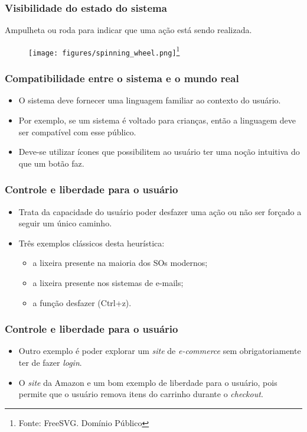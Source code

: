 \documentclass[11pt]{beamer}
\begin{document}
    \begin{frame}
      \frametitle{Visibilidade do estado do sistema}
      Ampulheta ou roda para indicar que uma ação está sendo realizada.
      \begin{figure}[ht]
        \centering
        \texttt{[image: figures/spinning\_wheel.png]}\footnote{Fonte: FreeSVG. Domínio Público}
      \end{figure}
    \end{frame}
    
    \begin{frame}
      \frametitle{Compatibilidade entre o sistema e o mundo real}
      \begin{itemize}
        \item O sistema deve fornecer uma linguagem familiar ao contexto do usuário.
        \item Por exemplo, se um sistema é voltado para crianças, então a linguagem deve ser compatível com esse público.
        \item Deve-se utilizar ícones que possibilitem ao usuário ter uma noção intuitiva do que um botão faz.
      \end{itemize}
    \end{frame}
    
    \begin{frame}
      \frametitle{Controle e liberdade para o usuário}
      \begin{itemize}
        \item Trata da capacidade do usuário poder desfazer uma ação ou não ser forçado a seguir um único caminho.
        \item Três exemplos clássicos desta heurística:
          \begin{itemize}
            \item a lixeira presente na maioria dos SOs modernos;
            \item a lixeira presente nos sistemas de e-mails;
            \item a função desfazer (Ctrl+z).
          \end{itemize}
      \end{itemize}
    \end{frame}

    \begin{frame}
      \frametitle{Controle e liberdade para o usuário}
      \begin{itemize}
        \item Outro exemplo é poder explorar um \textit{site} de \textit{e-commerce} sem obrigatoriamente ter de fazer \textit{login}.
        \item O \textit{site} da Amazon e um bom exemplo de liberdade para o usuário, pois permite que o usuário remova itens do carrinho durante o \textit{checkout}.
      \end{itemize}
    \end{frame}
    
\end{document}
